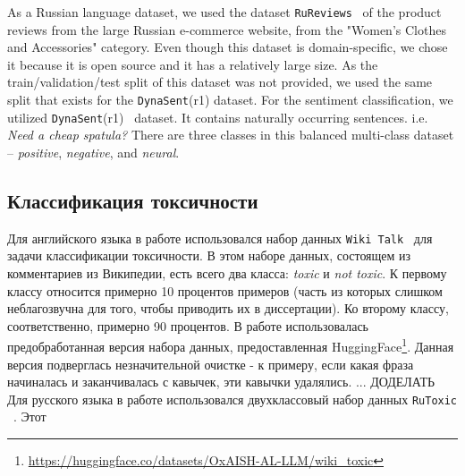 \begin{itemize}
As a Russian language dataset, we used the dataset \texttt{RuReviews}~\cite{ru_sentiment} of the product reviews from the large Russian e-commerce website, from the "Women’s Clothes and Accessories" category. Even though this dataset is domain-specific, we chose it because it is open source and it has a relatively large size. As the train/validation/test split of this dataset was not provided, we used the same split that exists for the \texttt{DynaSent}(r1) dataset. 
For the sentiment classification, we utilized \texttt{DynaSent}(r1)~\cite{sentiment} dataset. It contains naturally occurring sentences. i.e. \textit{Need a cheap spatula?} There are three classes in this balanced multi-class dataset -- \textit{positive},  \textit{negative}, and \textit{neural}. %


\subsection{Классификация токсичности}

Для английского языка в работе использовался набор данных  \texttt{Wiki Talk}~\cite{toxic} для задачи классификации токсичности. В этом наборе данных, состоящем из комментариев из Википедии, есть всего два класса: \textit{toxic} и \textit{not toxic}. К первому классу относится примерно 10 процентов примеров (часть из которых слишком неблагозвучна для того, чтобы приводить их в диссертации). Ко второму классу, соответственно, примерно 90 процентов.  В работе использовалась предобработанная версия набора данных, предоставленная HuggingFace\footnote{\url{https://huggingface.co/datasets/OxAISH-AL-LLM/wiki_toxic}}. Данная версия подверглась незначительной очистке - к примеру, если какая фраза начиналась и заканчивалась с кавычек, эти кавычки удалялись. 
... ДОДЕЛАТЬ
Для русского языка в работе использовался двухклассовый набор данных \texttt{RuToxic} ~\cite{ru_toxic}. Этот  %


\end{itemize}
